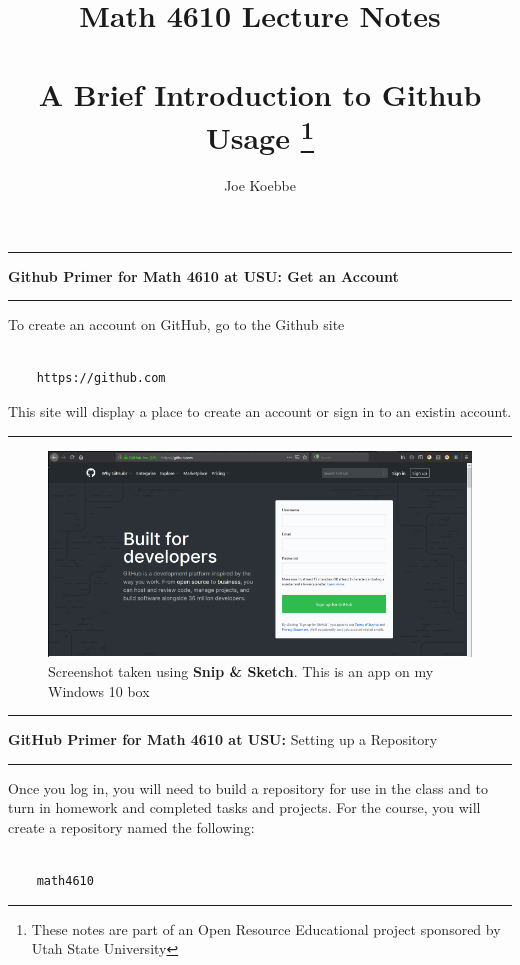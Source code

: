 \documentclass[10pt,fleqn]{article}
\title{Math 4610 Lecture Notes \\
            \ \\
       A Brief Introduction to Github Usage
  \footnote{These notes are part of an Open Resource Educational project
            sponsored by Utah State University}}
\author{Joe Koebbe}
\begin{document}
\maketitle
\newpage

\vskip0.1in\hrule\vskip0.1in
\noindent
{\bf Github Primer for Math 4610 at USU: Get an Account} 
\vskip0.1in\hrule\vskip0.1in
\noindent
To create an account on GitHub, go to the Github site
\begin{verbatim}

    https://github.com

\end{verbatim}
This site will display a place to create an account or sign in to an existin
account.
\vskip0.1in\hrule\vskip0.1in
\vfill
\begin{figure}[h]
\centering
\includegraphics{../images/github_01.png}
\vskip0.1in
\caption{{Screenshot} taken using {\bf Snip \& Sketch}. This is an app on
         my Windows 10 box}
\end{figure}
\eject
\vskip0.1in\hrule\vskip0.1in
\noindent
{{\bf GitHub Primer for Math 4610 at USU:} Setting up a Repository} 
\vskip0.1in\hrule\vskip0.1in
\noindent
Once you log in, you will need to build a repository for use in the class and
to turn in homework and completed tasks and projects. For the course, you will
create a repository named the following:
\begin{verbatim}

    math4610

\end{verbatim}
\end{document}
